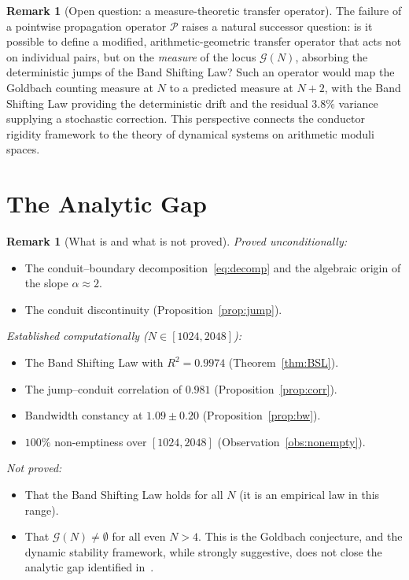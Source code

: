 \documentclass[11pt,a4paper]{article}
\theoremstyle{definition}
\newtheorem{remark}[theorem]{Remark}
\begin{document}
\begin{remark}[Open question: a measure-theoretic transfer operator]\label{rem:open}
  The failure of a pointwise propagation operator $\mathcal{P}$ raises a natural
  successor question: is it possible to define a modified,
  arithmetic-geometric transfer operator that acts not on individual pairs,
  but on the \emph{measure} of the locus $\mathscr{G}(N)$, absorbing the
  deterministic jumps of the Band Shifting Law?  Such an operator would map
  the Goldbach counting measure at $N$ to a predicted measure at $N + 2$,
  with the Band Shifting Law providing the deterministic drift and the
  residual $3.8\%$ variance supplying a stochastic correction.  This
  perspective connects the conductor rigidity framework to the theory of
  dynamical systems on arithmetic moduli spaces.
\end{remark}


\section{The Analytic Gap}\label{sec:gap}

\begin{remark}[What is and what is not proved]\label{rem:honest}
  \emph{Proved unconditionally:}
  \begin{itemize}
  \item The conduit--boundary decomposition~\eqref{eq:decomp} and the algebraic
    origin of the slope $\alpha \approx 2$.
  \item The conduit discontinuity (Proposition~\ref{prop:jump}).
  \end{itemize}
  \emph{Established computationally ($N \in [1024, 2048]$):}
  \begin{itemize}
  \item The Band Shifting Law with $R^2 = 0.9974$ (Theorem~\ref{thm:BSL}).
  \item The jump--conduit correlation of $0.981$ (Proposition~\ref{prop:corr}).
  \item Bandwidth constancy at $1.09 \pm 0.20$ (Proposition~\ref{prop:bw}).
  \item $100\%$ non-emptiness over $[1024, 2048]$ (Observation~\ref{obs:nonempty}).
  \end{itemize}
  \emph{Not proved:}
  \begin{itemize}
  \item That the Band Shifting Law holds for all $N$ (it is an empirical law in this
    range).
  \item That $\mathscr{G}(N) \neq \emptyset$ for all even $N > 4$.  This is the
    Goldbach conjecture, and the dynamic stability framework, while strongly
    suggestive, does not close the analytic gap identified
    in~\cite{Chen2026GMII}.
  \end{itemize}
\end{remark}
\end{document}
